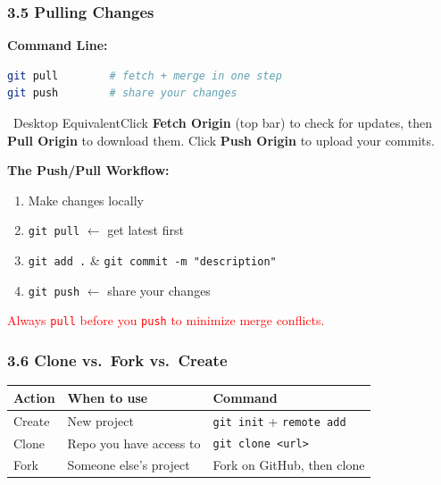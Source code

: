 \documentclass{beamer}
\newcommand{\desktoptip}[1]{\begin{block}{\faMousePointer\ Desktop Equivalent}#1\end{block}}
\begin{document}
\begin{frame}[fragile]
\frametitle{3.5 Pulling Changes}

\textbf{Command Line:}
\begin{lstlisting}[language=bash]
git pull        # fetch + merge in one step
git push        # share your changes
\end{lstlisting}

\desktoptip{Click \textbf{Fetch Origin} (top bar) to check for updates, then \textbf{Pull Origin} to download them. Click \textbf{Push Origin} to upload your commits.}

\vspace{2mm}
\textbf{The Push/Pull Workflow:}
\begin{enumerate}
    \item Make changes locally
    \item \texttt{git pull} \hfill $\leftarrow$ get latest first
    \item \texttt{git add .} \& \texttt{git commit -m "description"}
    \item \texttt{git push} \hfill $\leftarrow$ share your changes
\end{enumerate}

\textcolor{red}{Always \texttt{pull} before you \texttt{push} to minimize merge conflicts.}
\end{frame}

\begin{frame}
\frametitle{3.6 Clone vs.\ Fork vs.\ Create}
\begin{table}[h]
\centering
\small
\begin{tabular}{lll}
\toprule
\textbf{Action} & \textbf{When to use} & \textbf{Command} \\
\midrule
Create & New project & \texttt{git init} + \texttt{remote add} \\
Clone & Repo you have access to & \texttt{git clone <url>} \\
Fork & Someone else's project & Fork on GitHub, then clone \\
\bottomrule
\end{tabular}
\end{table}
\end{frame}
\end{document}
